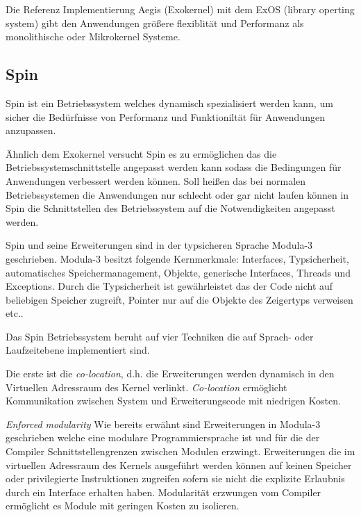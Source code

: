 \documentclass[9pt,technote]{IEEEtran}
\begin{document}
        Die Referenz Implementierung Aegis (Exokernel) mit dem ExOS (library operting system) gibt den Anwendungen gr\"o\ss ere flexiblit\"at 
        und Performanz als monolithische oder Mikrokernel Systeme. 
        
        
    \subsection{Spin}
       Spin ist ein Betriebssystem welches dynamisch spezialisiert werden kann, um sicher die Bed\"urfnisse von Performanz und Funktionilt\"at f\"ur
       Anwendungen anzupassen.
    
      \"Ahnlich dem Exokernel versucht Spin es zu erm\"oglichen das die Betriebssystemschnittstelle angepasst werden kann sodass die Bedingungen 
      f\"ur Anwendungen verbessert werden k\"onnen.
      Soll hei\ss en das bei normalen Betriebssystemen die Anwendungen nur schlecht oder gar nicht laufen k\"onnen in Spin die Schnittstellen 
      des Betriebssystem auf die Notwendigkeiten angepasst werden.
      
      Spin und seine Erweiterungen sind in der typsicheren Sprache Modula-3 geschrieben. Modula-3 besitzt folgende Kernmerkmale: 
      Interfaces, Typsicherheit, automatisches Speichermanagement,
      Objekte, generische Interfaces, Threads und Exceptions. Durch die Typsicherheit ist gew\"ahrleistet das der Code nicht auf beliebigen Speicher zugreift,
      Pointer nur auf die Objekte des Zeigertyps verweisen etc..
      
      Das Spin Betriebssystem beruht auf vier Techniken die auf Sprach- oder Laufzeitebene implementiert sind.
      
      Die erste ist die \textit{co-location}, d.h. die Erweiterungen werden dynamisch in den Virtuellen Adressraum des Kernel verlinkt.
      \textit{Co-location} erm\"oglicht Kommunikation zwischen System und Erweiterungscode mit niedrigen Kosten.
      
      \textit{Enforced modularity}  Wie bereits erw\"ahnt sind Erweiterungen in Modula-3 geschrieben welche eine modulare
      Programmiersprache ist und f\"ur die der Compiler Schnittstellengrenzen zwischen Modulen erzwingt.
      Erweiterungen die im virtuellen Adressraum des Kernels ausgef\"uhrt werden k\"onnen auf keinen Speicher oder privilegierte Instruktionen 
      zugreifen sofern sie nicht
      die explizite Erlaubnis durch ein Interface erhalten haben. Modularit\"at erzwungen vom Compiler erm\"oglicht es Module mit geringen Kosten zu isolieren.
      
\end{document}
